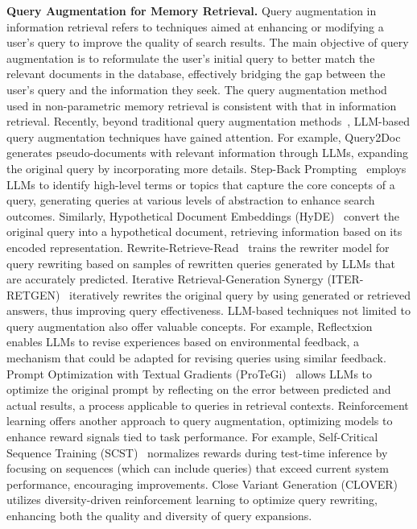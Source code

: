 \documentclass[journal,hideappendix]{vgtc}
\newenvironment{j_itemize}{
\begin{itemize}[]
  \setlength{\itemsep}{3pt}
  \setlength{\parskip}{0pt}
  \setlength{\parsep}{0pt}
}{\end{itemize}}
\begin{document}
\begin{j_itemize}
    \item[$\bullet$] \textbf{Query Augmentation for Memory Retrieval.} 
    Query augmentation in information retrieval refers to techniques aimed at enhancing or modifying a user's query to improve the quality of search results. The main objective of query augmentation is to reformulate the user's initial query to better match the relevant documents in the database, effectively bridging the gap between the user's query and the information they seek. 
    The query augmentation method used in non-parametric memory retrieval is consistent with that in information retrieval.
    Recently, beyond traditional query augmentation methods~\cite{aljadda2014crowdsourced,abdelkawi2019complex}, LLM-based query augmentation techniques have gained attention. For example, Query2Doc~\cite{wangetal2023query2doc} generates pseudo-documents with relevant information through LLMs, expanding the original query by incorporating more details. 
    Step-Back Prompting~\cite{zheng2023take} employs LLMs to identify high-level terms or topics that capture the core concepts of a query, generating queries at various levels of abstraction to enhance search outcomes. Similarly, Hypothetical Document Embeddings (HyDE)~\cite{gao2023precise} convert the original query into a hypothetical document, retrieving information based on its encoded representation. Rewrite-Retrieve-Read~\cite{maetal2023query} trains the rewriter model for query rewriting based on samples of rewritten queries generated by LLMs that are accurately predicted. Iterative Retrieval-Generation Synergy (ITER-RETGEN)~\cite{shaoetal2023enhancing} iteratively rewrites the original query by using generated or retrieved answers, thus improving query effectiveness. 
    LLM-based techniques not limited to query augmentation also offer valuable concepts. For example, Reflectxion~\cite{shinn2024reflexion} enables LLMs to revise experiences based on environmental feedback, a mechanism that could be adapted for revising queries using similar feedback. Prompt Optimization with Textual Gradients (ProTeGi)~\cite{pryzant2023automatic} allows LLMs to optimize the original prompt by reflecting on the error between predicted and actual results, a process applicable to queries in retrieval contexts.
    Reinforcement learning offers another approach to query augmentation, optimizing models to enhance reward signals tied to task performance. For example, Self-Critical Sequence Training (SCST)~\cite{rennie2017self} normalizes rewards during test-time inference by focusing on sequences (which can include queries) that exceed current system performance, encouraging improvements. Close Variant Generation (CLOVER)~\cite{mohankumar2021diversity} utilizes diversity-driven reinforcement learning to optimize query rewriting, enhancing both the quality and diversity of query expansions.

\end{j_itemize}
\end{document}
